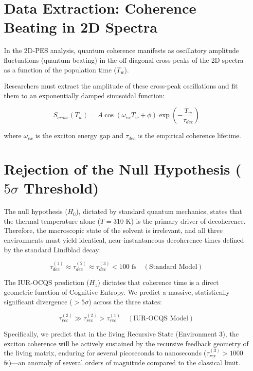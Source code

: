 \documentclass[12pt,openany]{book}
\begin{document}
\section{Data Extraction: Coherence Beating in 2D Spectra}
In the 2D-PES analysis, quantum coherence manifests as oscillatory amplitude fluctuations (quantum beating) in the off-diagonal cross-peaks of the 2D spectra as a function of the population time ($T_w$). 

Researchers must extract the amplitude of these cross-peak oscillations and fit them to an exponentially damped sinusoidal function:

\begin{equation}
S_{cross}(T_w) = A \cos(\omega_{ex} T_w + \phi) \exp\left(-\frac{T_w}{\tau_{dec}}\right)
\end{equation}

where $\omega_{ex}$ is the exciton energy gap and $\tau_{dec}$ is the empirical coherence lifetime.

\section{Rejection of the Null Hypothesis ($5\sigma$ Threshold)}
The null hypothesis ($H_0$), dictated by standard quantum mechanics, states that the thermal temperature alone ($T = 310$ K) is the primary driver of decoherence. Therefore, the macroscopic state of the solvent is irrelevant, and all three environments must yield identical, near-instantaneous decoherence times defined by the standard Lindblad decay:

\begin{equation}
\tau_{dec}^{(1)} \approx \tau_{dec}^{(2)} \approx \tau_{dec}^{(3)} < 100 \text{ fs} \quad (\text{Standard Model})
\end{equation}

The IUR-OCQS prediction ($H_1$) dictates that coherence time is a direct geometric function of Cognitive Entropy. We predict a massive, statistically significant divergence ($> 5\sigma$) across the three states:

\begin{equation}
\tau_{rec}^{(3)} \gg \tau_{rec}^{(2)} > \tau_{rec}^{(1)} \quad (\text{IUR-OCQS Model})
\end{equation}

Specifically, we predict that in the living Recursive State (Environment 3), the exciton coherence will be actively sustained by the recursive feedback geometry of the living matrix, enduring for several picoseconds to nanoseconds ($\tau_{rec}^{(3)} > 1000$ fs)---an anomaly of several orders of magnitude compared to the classical limit. 
\end{document}
